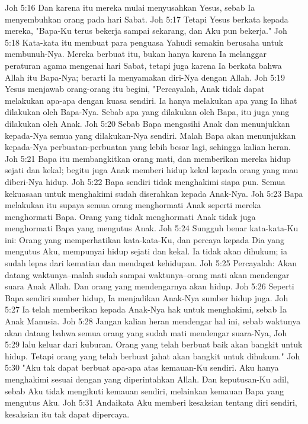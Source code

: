 Joh 5:16  Dan karena itu mereka mulai menyusahkan Yesus, sebab Ia menyembuhkan orang pada hari Sabat.
Joh 5:17  Tetapi Yesus berkata kepada mereka, "Bapa-Ku terus bekerja sampai sekarang, dan Aku pun bekerja."
Joh 5:18  Kata-kata itu membuat para penguasa Yahudi semakin berusaha untuk membunuh-Nya. Mereka berbuat itu, bukan hanya karena Ia melanggar peraturan agama mengenai hari Sabat, tetapi juga karena Ia berkata bahwa Allah itu Bapa-Nya; berarti Ia menyamakan diri-Nya dengan Allah.
Joh 5:19  Yesus menjawab orang-orang itu begini, "Percayalah, Anak tidak dapat melakukan apa-apa dengan kuasa sendiri. Ia hanya melakukan apa yang Ia lihat dilakukan oleh Bapa-Nya. Sebab apa yang dilakukan oleh Bapa, itu juga yang dilakukan oleh Anak.
Joh 5:20  Sebab Bapa mengasihi Anak dan menunjukkan kepada-Nya semua yang dilakukan-Nya sendiri. Malah Bapa akan menunjukkan kepada-Nya perbuatan-perbuatan yang lebih besar lagi, sehingga kalian heran.
Joh 5:21  Bapa itu membangkitkan orang mati, dan memberikan mereka hidup sejati dan kekal; begitu juga Anak memberi hidup kekal kepada orang yang mau diberi-Nya hidup.
Joh 5:22  Bapa sendiri tidak menghakimi siapa pun. Semua kekuasaan untuk menghakimi sudah diserahkan kepada Anak-Nya.
Joh 5:23  Bapa melakukan itu supaya semua orang menghormati Anak seperti mereka menghormati Bapa. Orang yang tidak menghormati Anak tidak juga menghormati Bapa yang mengutus Anak.
Joh 5:24  Sungguh benar kata-kata-Ku ini: Orang yang memperhatikan kata-kata-Ku, dan percaya kepada Dia yang mengutus Aku, mempunyai hidup sejati dan kekal. Ia tidak akan dihukum; ia sudah lepas dari kematian dan mendapat kehidupan.
Joh 5:25  Percayalah: Akan datang waktunya--malah sudah sampai waktunya--orang mati akan mendengar suara Anak Allah. Dan orang yang mendengarnya akan hidup.
Joh 5:26  Seperti Bapa sendiri sumber hidup, Ia menjadikan Anak-Nya sumber hidup juga.
Joh 5:27  Ia telah memberikan kepada Anak-Nya hak untuk menghakimi, sebab Ia Anak Manusia.
Joh 5:28  Jangan kalian heran mendengar hal ini, sebab waktunya akan datang bahwa semua orang yang sudah mati mendengar suara-Nya,
Joh 5:29  lalu keluar dari kuburan. Orang yang telah berbuat baik akan bangkit untuk hidup. Tetapi orang yang telah berbuat jahat akan bangkit untuk dihukum."
Joh 5:30  "Aku tak dapat berbuat apa-apa atas kemauan-Ku sendiri. Aku hanya menghakimi sesuai dengan yang diperintahkan Allah. Dan keputusan-Ku adil, sebab Aku tidak mengikuti kemauan sendiri, melainkan kemauan Bapa yang mengutus Aku.
Joh 5:31  Andaikata Aku memberi kesaksian tentang diri sendiri, kesaksian itu tak dapat dipercaya.
